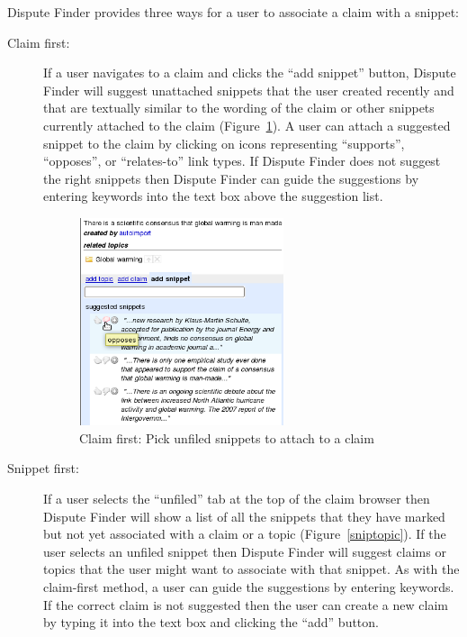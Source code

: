 \documentclass{www2010-submission}
\newcommand{\todo}[1]{}
\begin{document}
Dispute Finder provides three ways for a user to associate a claim with a snippet:

\begin{description}
\item[Claim first:] If a user navigates to a claim and clicks the ``add snippet'' button, Dispute Finder will suggest unattached snippets that the user created recently and that are textually similar to the wording of the claim or other snippets currently attached to the claim (Figure~\ref{snipclaim}). A user can attach a suggested snippet to the claim by clicking on icons representing ``supports'', ``opposes'', or ``relates-to'' link types. If Dispute Finder does not suggest the right snippets then Dispute Finder can guide the suggestions by entering keywords into the text box above the suggestion list.

\begin{figure}[tb]
	\begin{center}
	\includegraphics[width=6cm]{../screenshots/v2_sugsnippet.png}
	\caption{Claim first: Pick unfiled snippets to attach to a claim}
	\label{snipclaim}
	\end{center}
\end{figure}

\item[Snippet first:] If a user selects the ``unfiled'' tab at the top of the claim browser then Dispute Finder will show a list of all the snippets that they have marked but not yet associated with a claim or a topic (Figure~\ref{sniptopic}). If the user selects an unfiled snippet then Dispute Finder will suggest claims or topics that the user might want to associate with that snippet. As with the claim-first method, a user can guide the suggestions by entering keywords. If the correct claim is not suggested then the user can create a new claim by typing it into the text box and clicking the ``add'' button.

\todo{Updated screenshot with ``enter new claim or search keywords'' present}


\end{description}
\end{document}
